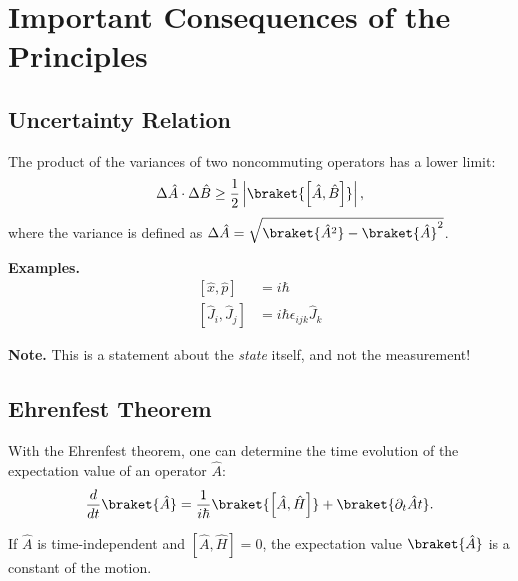 \section{Important Consequences of the Principles}
\subsection{Uncertainty Relation}

The product of the variances of two noncommuting operators has a lower limit:
\begin{align}
    \Delta \hat{A} \cdot \Delta \hat{B} \geq \frac{1}{2} \left| \braket{\left[\hat{A},\hat{B}\right]} \right|,
\end{align}
where the variance is defined as $\Delta \hat{A} = \sqrt{\braket{\hat{A}^2}-\braket{\hat{A}}^2}$.

\textbf{Examples.}
\begin{align}
	\left[ \hat{x}, \hat{p} \right] &= i \hbar \\
\left[ \hat{J}_i , \hat{J}_j \right] &= i \hbar \epsilon_{ijk} \hat{J}_k
\end{align}
				
\textbf{Note.} This is a statement about the \emph{state} itself, and not the measurement!

\subsection{Ehrenfest Theorem}
With the Ehrenfest theorem, one can determine the time evolution of the expectation value of an operator $\hat{A}$:
\begin{align}
 \frac{d}{dt}\braket{\hat{A}}=\frac{1}{i\hbar}\braket{\left[\hat{A},\hat{H}\right]}+\braket{\partial_t{\hat{A}}{t}}. \label{eq:ehrenfest}
\end{align}

If $\hat{A}$ is time-independent and $\left[\hat{A},\hat{H}\right]=0$, the expectation value $\braket{\hat{A}}$ is a constant of the motion.